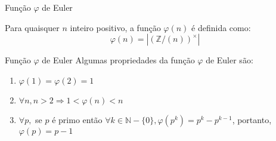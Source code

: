 \begin{frame}[fragile]{Função $\varphi$ de Euler}
    \begin{definicao} Para quaisquer $n$ inteiro positivo, a função $\varphi(n)$ é definida como: 
        \begin{equation} \label{def:phi}
            \varphi(n) = |(\mathbb{Z}/(n))^{\times}|
        \end{equation}
    \end{definicao}
\end{frame}

\begin{frame}[fragile]{Função $\varphi$ de Euler}
    Algumas propriedades da função $\varphi$ de Euler são:
    \begin{enumerate}
        \item $\varphi(1) = \varphi(2) = 1$
        \item \label{item:prop-phi-2} $\forall n, n > 2 \Rightarrow 1 < \varphi(n) < n$
        \item \label{item:prop-phi-3} $\forall p,$ se $p$ é primo então $\forall k \in \mathbb{N} - \{0\}, \varphi(p^k) = p^k - p^{k-1}$, portanto, $\varphi(p) = p - 1$
    \end{enumerate}
\end{frame}

